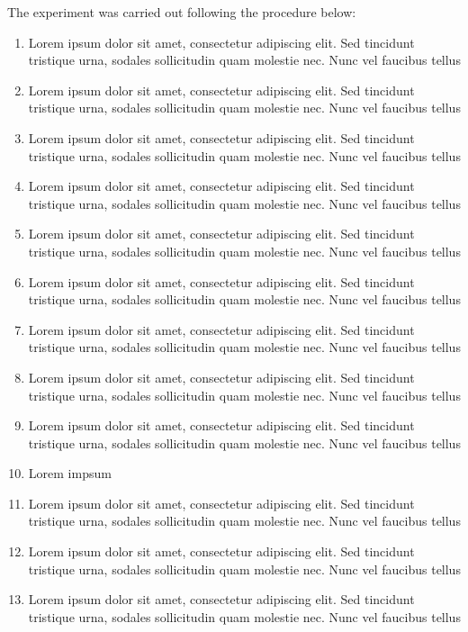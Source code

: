 \documentclass{article}
\begin{document}
The experiment was carried out following the procedure below:
\begin{enumerate}[topsep=\parskip, noitemsep]
    \item Lorem ipsum dolor sit amet, consectetur adipiscing elit. Sed tincidunt tristique urna, sodales sollicitudin quam molestie nec. Nunc vel faucibus tellus
    \item Lorem ipsum dolor sit amet, consectetur adipiscing elit. Sed tincidunt tristique urna, sodales sollicitudin quam molestie nec. Nunc vel faucibus tellus
    \item Lorem ipsum dolor sit amet, consectetur adipiscing elit. Sed tincidunt tristique urna, sodales sollicitudin quam molestie nec. Nunc vel faucibus tellus
    \item Lorem ipsum dolor sit amet, consectetur adipiscing elit. Sed tincidunt tristique urna, sodales sollicitudin quam molestie nec. Nunc vel faucibus tellus
    \item Lorem ipsum dolor sit amet, consectetur adipiscing elit. Sed tincidunt tristique urna, sodales sollicitudin quam molestie nec. Nunc vel faucibus tellus
    \item Lorem ipsum dolor sit amet, consectetur adipiscing elit. Sed tincidunt tristique urna, sodales sollicitudin quam molestie nec. Nunc vel faucibus tellus
    \item Lorem ipsum dolor sit amet, consectetur adipiscing elit. Sed tincidunt tristique urna, sodales sollicitudin quam molestie nec. Nunc vel faucibus tellus
    \item Lorem ipsum dolor sit amet, consectetur adipiscing elit. Sed tincidunt tristique urna, sodales sollicitudin quam molestie nec. Nunc vel faucibus tellus
    \item Lorem ipsum dolor sit amet, consectetur adipiscing elit. Sed tincidunt tristique urna, sodales sollicitudin quam molestie nec. Nunc vel faucibus tellus
    \item Lorem impsum
    \item Lorem ipsum dolor sit amet, consectetur adipiscing elit. Sed tincidunt tristique urna, sodales sollicitudin quam molestie nec. Nunc vel faucibus tellus
    \item Lorem ipsum dolor sit amet, consectetur adipiscing elit. Sed tincidunt tristique urna, sodales sollicitudin quam molestie nec. Nunc vel faucibus tellus
    \item Lorem ipsum dolor sit amet, consectetur adipiscing elit. Sed tincidunt tristique urna, sodales sollicitudin quam molestie nec. Nunc vel faucibus tellus

\end{enumerate}
\end{document}
